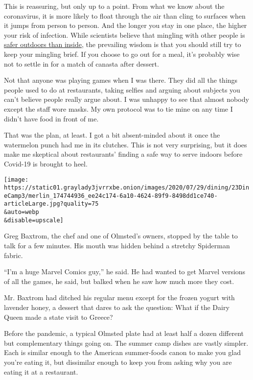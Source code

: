 This is reassuring, but only up to a point. From what we know about the
coronavirus, it is more likely to float through the air than cling to
surfaces when it jumps from person to person. And the longer you stay in
one place, the higher your risk of infection. While scientists believe
that mingling with other people is
\href{https://www.nytimes3xbfgragh.onion/2020/05/15/dining/restaurant-opening-safety-coronavirus.html}{safer
outdoors than inside}, the prevailing wisdom is that you should still
try to keep your mingling brief. If you choose to go out for a meal,
it's probably wise not to settle in for a match of canasta after
dessert.

Not that anyone was playing games when I was there. They did all the
things people used to do at restaurants, taking selfies and arguing
about subjects you can't believe people really argue about. I was
unhappy to see that almost nobody except the staff wore masks. My own
protocol was to tie mine on any time I didn't have food in front of me.

That was the plan, at least. I got a bit absent-minded about it once the
watermelon punch had me in its clutches. This is not very surprising,
but it does make me skeptical about restaurants' finding a safe way to
serve indoors before Covid-19 is brought to heel.

\texttt{[image: https://static01.graylady3jvrrxbe.onion/images/2020/07/29/dining/23DineCamp3/merlin\_174744936\_ee24c174-6a10-4624-89f9-8498dd1ce740-articleLarge.jpg?quality=75\\\&auto=webp\\\&disable=upscale]}

Greg Baxtrom, the chef and one of Olmsted's owners, stopped by the table
to talk for a few minutes. His mouth was hidden behind a stretchy
Spiderman fabric.

``I'm a huge Marvel Comics guy,'' he said. He had wanted to get Marvel
versions of all the games, he said, but balked when he saw how much more
they cost.

Mr. Baxtrom had ditched his regular menu except for the frozen yogurt
with lavender honey, a dessert that dares to ask the question: What if
the Dairy Queen made a state visit to Greece?

Before the pandemic, a typical Olmsted plate had at least half a dozen
different but complementary things going on. The summer camp dishes are
vastly simpler. Each is similar enough to the American summer-foods
canon to make you glad you're eating it, but dissimilar enough to keep
you from asking why you are eating it at a restaurant.

